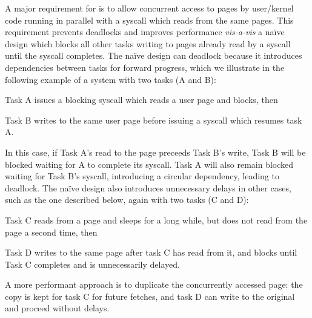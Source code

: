 A major requirement for \midas is to allow concurrent access to pages
by user/kernel code running in parallel with a syscall which reads from
the same pages.
This requirement prevents deadlocks and improves performance \textit{vis-a-vis}
a na\"ive design which blocks all other tasks writing to pages already
read by a syscall until the syscall completes.
The na\"ive design can deadlock because it introduces dependencies between
tasks for forward progress, which we illustrate in the following example
of a system with two tasks (A and B):
\begin{inparaenum}
  \item Task A issues a blocking syscall which reads a user page and blocks, then
  \item Task B writes to the same user page before issuing a syscall which
  resumes task A.
\end{inparaenum}
In this case, if Task A's read to the page preceeds Task B's write,
Task B will be blocked waiting for A to complete its syscall.
Task A will also remain blocked waiting for Task B's syscall,
introducing a circular dependency, leading to deadlock.
The na\"ive design also introduces unnecessary delays in other cases,
such as the one described below, again with two tasks (C and D):
\begin{inparaenum}
  \item Task C reads from a page and sleeps for a long while,
        but does not read from the page a second time, then
  \item Task D writes to the same page after task C has read from it,
        and blocks until Task C completes and is unnecessarily delayed.
\end{inparaenum}
A more performant approach is to duplicate the concurrently accessed page:
the copy is kept for task C for future fetches, and task D
can write to the original and proceed without delays.

